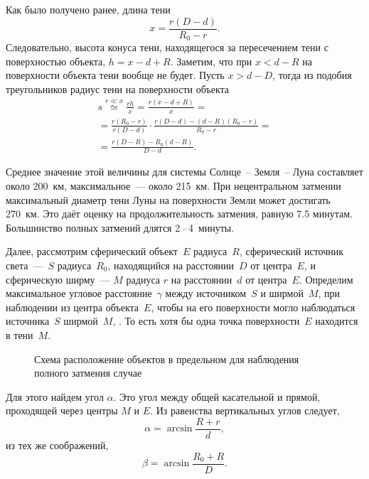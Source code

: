 Как было получено ранее, длина тени
\begin{equation*}
    x = \frac{r (D - d)}{R_0 - r}.
\end{equation*}
Следовательно, высота конуса тени, находящегося за пересечением тени с поверхностью объекта, $h = x - d + R$. Заметим, что при $x < d - R$ на поверхности объекта тени вообще не будет. Пусть $x > d - D$, тогда из подобия треугольников радиус тени на поверхности объекта
\begin{multline}
    s 
        \overset{r \ll x}{\simeq} \frac{r h}{x} 
        = \frac{r(x - d + R)}{x} = \\
        = \frac{r (R_0 - r)}{r (D - d)} \cdot \frac{r(D - d) - (d - R)(R_0 - r)}{R_0 - r} = \\
        = \frac{r (D - R) - R_0 (d - R)}{D - d}.
\end{multline}

Среднее значение этой величины для системы Солнце~-- Земля~-- Луна составляет около 200~км, максимальное~--- около 215~км. При нецентральном затмении максимальный диаметр тени Луны на поверхности Земли может достигать 270~км. Это даёт оценку на продолжительность затмения, равную 7.5 минутам. Большинство полных затмений длятся 2\,--\,4~минуты.

Далее, рассмотрим сферический объект~$E$ радиуса~$R$, сферический источник света~---~$S$ радиуса~$R_0$, находящийся на расстоянии~$D$ от центра~$E$, и сферическую ширму~--- $M$ радиуса $r$ на расстоянии~$d$ от центра~$E$. Определим максимальное угловое расстояние~$\gamma$ между источником~$S$ и ширмой~$M$, при наблюдении из центра объекта~$E$, чтобы на его поверхности могло наблюдаться  источника~$S$ ширмой~$M$, . То есть хотя бы одна точка поверхности~$E$ находится в тени~$M$.

\begin{figure}[h!]
    \centering
    
    \caption{Схема расположение объектов в предельном для наблюдения полного затмения случае}
    \label{pic:eclipse-vertical-distance}
\end{figure}

Для этого найдем угол $\alpha$. Это угол между общей касательной и прямой, проходящей через центры $M$ и $E$. Из равенства вертикальных углов следует, 
\begin{equation}
    \alpha = \arcsin \frac{R + r}{d},
    \label{eq:eclipses-vertial-distance-alpha}
\end{equation}
из тех же соображений,
\begin{equation*}
    \beta = \arcsin \frac{R_0 + R}{D}.
\end{equation*}

